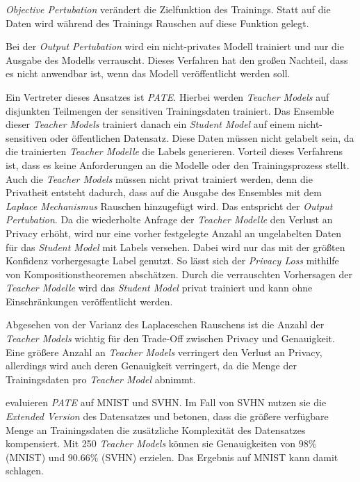 \textit{Objective Pertubation} verändert die Zielfunktion des Trainings. Statt auf die Daten wird während des Trainings Rauschen auf diese Funktion gelegt.

Bei der \textit{Output Pertubation} wird ein nicht-privates Modell trainiert und nur die Ausgabe des Modells verrauscht. Dieses Verfahren hat den großen Nachteil, dass es nicht anwendbar ist, wenn das Modell veröffentlicht werden soll.

Ein Vertreter dieses Ansatzes ist \textit{PATE}\cite{papernot:2017}. Hierbei werden \textit{Teacher Models} auf disjunkten Teilmengen der sensitiven Trainingsdaten trainiert. Das Ensemble dieser \textit{Teacher Models} trainiert danach ein \textit{Student Model} auf einem nicht-sensitiven oder öffentlichen Datensatz. Diese Daten müssen nicht gelabelt sein, da die trainierten \textit{Teacher Modelle} die Labels generieren. Vorteil dieses Verfahrens ist, dass es keine Anforderungen an die Modelle oder den Trainingsprozess stellt. Auch die \textit{Teacher Models} müssen nicht privat trainiert werden, denn die Privatheit entsteht dadurch, dass auf die Ausgabe des Ensembles mit dem \textit{Laplace Mechanismus} Rauschen hinzugefügt wird. Das entspricht der \textit{Output Pertubation}. Da die wiederholte Anfrage der \textit{Teacher Modelle} den Verlust an Privacy erhöht, wird nur eine vorher festgelegte Anzahl an ungelabelten Daten für das \textit{Student Model} mit Labels versehen. Dabei wird nur das mit der größten Konfidenz vorhergesagte Label genutzt. So lässt sich der \textit{Privacy Loss} mithilfe von Kompositionstheoremen abschätzen. Durch die verrauschten Vorhersagen der \textit{Teacher Modelle} wird das \textit{Student Model} privat trainiert und kann ohne Einschränkungen veröffentlicht werden.

Abgesehen von der Varianz des Laplaceschen Rauschens ist die Anzahl der \textit{Teacher Models} wichtig für den Trade-Off zwischen Privacy und Genauigkeit. Eine größere Anzahl an \textit{Teacher Models} verringert den Verlust an Privacy, allerdings wird auch deren Genauigkeit verringert, da die Menge der Trainingsdaten pro \textit{Teacher Model} abnimmt.

\textcite{papernot:2017} evaluieren \textit{PATE} auf MNIST und SVHN. Im Fall von SVHN nutzen sie die \textit{Extended Version} des Datensatzes und betonen, dass die größere verfügbare Menge an Trainingsdaten die zusätzliche Komplexität des Datensatzes kompensiert. Mit 250 \textit{Teacher Models} können sie Genauigkeiten von $98\%$ (MNIST) und $90.66\%$ (SVHN) erzielen. Das Ergebnis auf MNIST kann damit \textcite{abadi:2016} schlagen.

